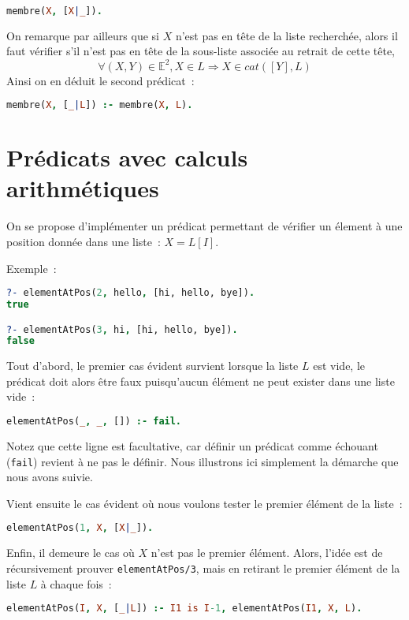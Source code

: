 \begin{lstlisting}[language=Prolog,frame=single]
membre(X, [X|_]).
\end{lstlisting}

On remarque par ailleurs que si $X$ n'est pas en tête de la liste recherchée, alors il faut vérifier s'il n'est pas en tête de la sous-liste associée au retrait de cette tête, 
\[\forall (X, Y) \in \mathbb{E}^2, X \in L \Rightarrow X \in cat([Y], L)\]
Ainsi on en déduit le second prédicat~:
\begin{lstlisting}[language=Prolog,frame=single]
membre(X, [_|L]) :- membre(X, L).
\end{lstlisting}


\section{Prédicats avec calculs arithmétiques}

On se propose d'implémenter un prédicat permettant de vérifier un élement à une
position donnée dans une liste~: $X = L[I]$.

Exemple~:
\begin{lstlisting}[language=Prolog,frame=single]
?- elementAtPos(2, hello, [hi, hello, bye]).
true

?- elementAtPos(3, hi, [hi, hello, bye]).
false
\end{lstlisting}


Tout d'abord, le premier cas évident survient lorsque la liste $L$ est vide, le
prédicat doit alors être faux puisqu'aucun élément ne peut exister dans une liste vide~:
\begin{lstlisting}[language=Prolog,frame=single]
elementAtPos(_, _, []) :- fail.
\end{lstlisting}
Notez que cette ligne est facultative, car définir un prédicat comme échouant
(\texttt{fail}) revient à ne pas le définir. Nous illustrons ici simplement la démarche que nous avons suivie.

Vient ensuite le cas évident où nous voulons tester le premier élément de la liste~:
\begin{lstlisting}[language=Prolog,frame=single]
elementAtPos(1, X, [X|_]).
\end{lstlisting}

Enfin, il demeure le cas où $X$ n'est pas le premier élément. Alors, l'idée est
de récursivement prouver \texttt{elementAtPos/3}, mais en retirant le premier élément de la liste $L$ à chaque fois~:
\begin{lstlisting}[language=Prolog,frame=single]
elementAtPos(I, X, [_|L]) :- I1 is I-1, elementAtPos(I1, X, L).
\end{lstlisting}

